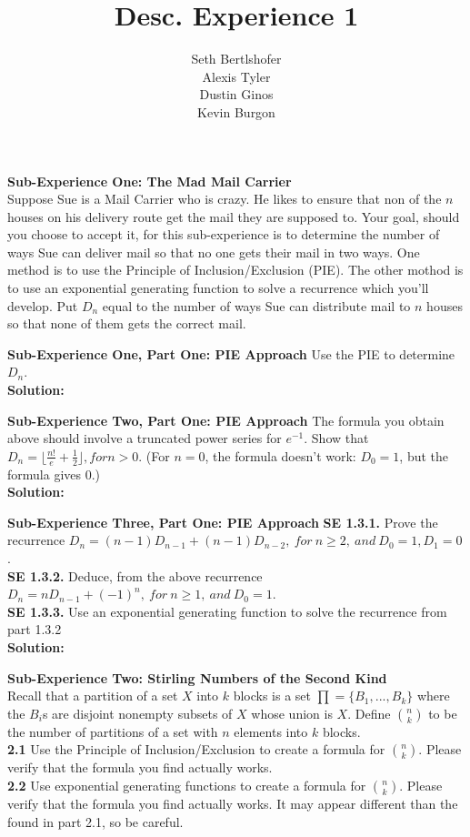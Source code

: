 \documentclass[10pt,a4paper]{report}
\author{Seth Bertlshofer\\Alexis Tyler\\Dustin Ginos\\Kevin Burgon}
\title{Desc. Experience 1}
\begin{document}
	\maketitle
	\textbf{Sub-Experience One: The Mad Mail Carrier}\\
	Suppose Sue is a Mail Carrier who is crazy.  He likes to ensure that non of the $n$ houses on his delivery route get the mail they are supposed to.  Your goal, should you choose to accept it, for this sub-experience is to determine the number of ways Sue can deliver mail so that no one gets their mail in two ways.  One method is to use the Principle of Inclusion/Exclusion (PIE).  The other mothod is to use an exponential generating function to solve a recurrence which you'll develop.  Put $D_n$ equal to the number of ways Sue can distribute mail to $n$ houses so that none of them gets the correct mail.
	
	\textbf{Sub-Experience One, Part One: PIE Approach}
	Use the PIE to determine $D_n$.\\
	
	\textbf{Solution: }\\
	\newline
	
	\textbf{Sub-Experience Two, Part One: PIE Approach}
	The formula you obtain above should involve a truncated power series for $e^{-1}$.  Show that $D_n = \lfloor\frac{n!}{e}+\frac{1}{2}\rfloor, for n > 0$. (For $n=0$, the formula doesn't work: $D_0 = 1$, but the formula gives 0.)\\
	\textbf{Solution: }\\
	\newline
	
	\textbf{Sub-Experience Three, Part One: PIE Approach}
	\textbf{SE 1.3.1.} Prove the recurrence $D_n = (n-1)D_{n-1} + (n-1)D_{n-2},\ for\ n\geq 2,\ and\ D_0 = 1, D_1=0$.\\
	\textbf{SE 1.3.2.} Deduce, from the above recurrence $D_n = nD_{n-1}+(-1)^n,\ for\ n\geq 1,\ and\ D_0 = 1$.\\
	\textbf{SE 1.3.3.} Use an exponential generating function to solve the recurrence from part 1.3.2\\
	\textbf{Solution: }\\
	\newline
	
	
	\textbf{Sub-Experience Two: Stirling Numbers of the Second Kind}\\
	Recall that a partition of a set $X$ into $k$ blocks is a set $\prod = \{B_1,...,B_k\}$ where the $B_i$s are disjoint nonempty subsets of $X$ whose union is $X$. Define ${n}\choose{k}$ to be the number of partitions of a set with $n$ elements into $k$ blocks.\\
	\textbf{2.1} Use the Principle of Inclusion/Exclusion to create a formula for ${n}\choose{k}$.  Please verify that the formula you find actually works.\\
	\textbf{2.2} Use exponential generating functions to create a formula for ${n}\choose{k}$.  Please verify that the formula you find actually works.  It may appear different than the found in part 2.1, so be careful.
	
\end{document}
